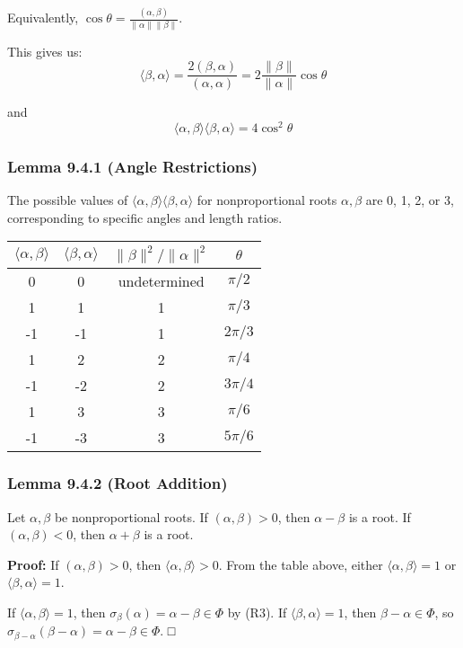 Equivalently, $\cos \theta = \frac{(\alpha, \beta)}{\|\alpha\|\|\beta\|}$.

This gives us:
\[
\langle\beta, \alpha\rangle = \frac{2(\beta, \alpha)}{(\alpha, \alpha)} = 2 \frac{\|\beta\|}{\|\alpha\|} \cos \theta
\]

and
\[
\langle\alpha, \beta\rangle\langle\beta, \alpha\rangle = 4 \cos^2 \theta
\]

\subsubsection{Lemma 9.4.1 (Angle Restrictions)}

The possible values of $\langle\alpha, \beta\rangle\langle\beta, \alpha\rangle$ for nonproportional roots $\alpha, \beta$ are 0, 1, 2, or 3, corresponding to specific angles and length ratios.

\begin{table}[h]
	\centering
	\begin{tabular}{|c|c|c|c|}
		\hline
		$\langle\alpha, \beta\rangle$ & $\langle\beta, \alpha\rangle$ & $\|\beta\|^2/\|\alpha\|^2$ & $\theta$ \\
		\hline
		0 & 0 & undetermined & $\pi/2$ \\
		\hline
		1 & 1 & 1 & $\pi/3$ \\
		\hline
		-1 & -1 & 1 & $2\pi/3$ \\
		\hline
		1 & 2 & 2 & $\pi/4$ \\
		\hline
		-1 & -2 & 2 & $3\pi/4$ \\
		\hline
		1 & 3 & 3 & $\pi/6$ \\
		\hline
		-1 & -3 & 3 & $5\pi/6$ \\
		\hline
	\end{tabular}
\end{table}
\subsubsection{Lemma 9.4.2 (Root Addition)}

Let $\alpha, \beta$ be nonproportional roots. If $(\alpha, \beta) > 0$, then $\alpha - \beta$ is a root. If $(\alpha, \beta) < 0$, then $\alpha + \beta$ is a root.

\textbf{Proof:}
If $(\alpha, \beta) > 0$, then $\langle\alpha, \beta\rangle > 0$. From the table above, either $\langle\alpha, \beta\rangle = 1$ or $\langle\beta, \alpha\rangle = 1$.

If $\langle\alpha, \beta\rangle = 1$, then $\sigma_\beta(\alpha) = \alpha - \beta \in \Phi$ by (R3).
If $\langle\beta, \alpha\rangle = 1$, then $\beta - \alpha \in \Phi$, so $\sigma_{\beta-\alpha}(\beta-\alpha) = \alpha - \beta \in \Phi$. □

